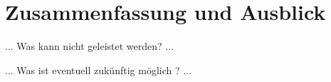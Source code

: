 \section{Zusammenfassung und Ausblick}

... Was kann nicht geleistet werden? ...

... Was ist eventuell zukünftig möglich ? ...